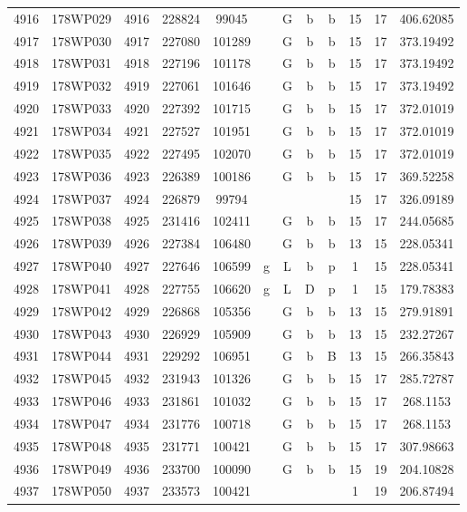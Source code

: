 \begin{tabular}{|*{12}{c|}}
4916 & 178WP029 & 4916 & 228824 & 99045 &  & G & b & b & 15 & 17 & 406.62085 \\ 
4917 & 178WP030 & 4917 & 227080 & 101289 &  & G & b & b & 15 & 17 & 373.19492 \\ 
4918 & 178WP031 & 4918 & 227196 & 101178 &  & G & b & b & 15 & 17 & 373.19492 \\ 
4919 & 178WP032 & 4919 & 227061 & 101646 &  & G & b & b & 15 & 17 & 373.19492 \\ 
4920 & 178WP033 & 4920 & 227392 & 101715 &  & G & b & b & 15 & 17 & 372.01019 \\ 
4921 & 178WP034 & 4921 & 227527 & 101951 &  & G & b & b & 15 & 17 & 372.01019 \\ 
4922 & 178WP035 & 4922 & 227495 & 102070 &  & G & b & b & 15 & 17 & 372.01019 \\ 
4923 & 178WP036 & 4923 & 226389 & 100186 &  & G & b & b & 15 & 17 & 369.52258 \\ 
4924 & 178WP037 & 4924 & 226879 & 99794 &  &  &  &  & 15 & 17 & 326.09189 \\ 
4925 & 178WP038 & 4925 & 231416 & 102411 &  & G & b & b & 15 & 17 & 244.05685 \\ 
4926 & 178WP039 & 4926 & 227384 & 106480 &  & G & b & b & 13 & 15 & 228.05341 \\ 
4927 & 178WP040 & 4927 & 227646 & 106599 & g & L & b & p & 1 & 15 & 228.05341 \\ 
4928 & 178WP041 & 4928 & 227755 & 106620 & g & L & D & p & 1 & 15 & 179.78383 \\ 
4929 & 178WP042 & 4929 & 226868 & 105356 &  & G & b & b & 13 & 15 & 279.91891 \\ 
4930 & 178WP043 & 4930 & 226929 & 105909 &  & G & b & b & 13 & 15 & 232.27267 \\ 
4931 & 178WP044 & 4931 & 229292 & 106951 &  & G & b & B & 13 & 15 & 266.35843 \\ 
4932 & 178WP045 & 4932 & 231943 & 101326 &  & G & b & b & 15 & 17 & 285.72787 \\ 
4933 & 178WP046 & 4933 & 231861 & 101032 &  & G & b & b & 15 & 17 & 268.1153 \\ 
4934 & 178WP047 & 4934 & 231776 & 100718 &  & G & b & b & 15 & 17 & 268.1153 \\ 
4935 & 178WP048 & 4935 & 231771 & 100421 &  & G & b & b & 15 & 17 & 307.98663 \\ 
4936 & 178WP049 & 4936 & 233700 & 100090 &  & G & b & b & 15 & 19 & 204.10828 \\ 
4937 & 178WP050 & 4937 & 233573 & 100421 &  &  &  &  & 1 & 19 & 206.87494 \\ 

\end{tabular}
